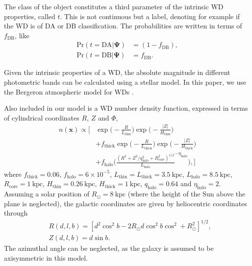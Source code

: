 \documentclass[fleqn,usenatbib]{mnras}
\newcommand{\popp}{\boldsymbol{\Psi}}
\newcommand{\pr}{\text{Pr}}
\newcommand{\kpc}{\text{kpc}}
\begin{document}
The class of the object constitutes a third parameter of the intrinsic WD properties, called $t$. This is not continuous but a label, denoting for example if the WD is of DA or DB classification. The probabilities are written in terms of $f_\text{DB}$, like
\begin{equation}\label{eq:DADB}
\begin{split}
	\pr(t=\text{DA} | \popp) & = (1-f_\text{DB}),\\
    \pr(t=\text{DB} | \popp) & = f_\text{DB}.
\end{split}
\end{equation}

Given the intrinsic properties of a WD, the absolute magnitude in different photometric bands can be calculated using a stellar model. In this paper, we use the Bergeron atmospheric model for WDs \citep{Bergeron:1995we,Finley:1997zz,Bergeron:2000ce,2001PASP..113..409F}.

Also included in our model is a WD number density function, expressed in terms of cylindrical coordinates $R$, $Z$ and $\Phi$,
\begin{equation}\label{eq:numberdensity}
\begin{split}
	n(\mathbf{x}) \propto
	\Bigg[ 
		& \exp\Bigg(-\frac{R}{L_\text{thin}}\Bigg)\exp\Bigg(-\frac{|Z|}{H_\text{thin}}\Bigg) \\
		& +f_\text{thick}\exp\Bigg(-\frac{R}{L_\text{thick}}\Bigg)\exp\Bigg(-\frac{|Z|}{H_\text{thick}}\Bigg) \\
		& +f_\text{halo}\Bigg( \frac{(R^2+Z^2/q_\text{halo}^2+R_\text{core}^2)^{1/2}}{L_\text{halo}}^{-\eta_\text{halo}} \Bigg),
	\Bigg]
\end{split}
\end{equation}
where $f_\text{thick}=0.06$, $f_\text{halo}=6\times10^{-5}$, $L_\text{thin}=L_\text{thick}=3.5~\kpc$, $L_\text{halo}=8.5~\kpc$, $R_\text{core}=1~\kpc$, $H_\text{thin}=0.26~\kpc$, $H_\text{thick}=1~\kpc$, $q_\text{halo}=0.64$ and $\eta_\text{halo} = 2$. Assuming a solar position of $R_\odot=8~\kpc$ (where the height of the Sun above the plane is neglected), the galactic coordinates are given by heliocentric coordinates through
\begin{equation}
\begin{split}
	& R(d,l,b) = [d^2\cos^2b-2 R_\odot d \cos^2b\cos^2+R_\odot^2]^{1/2}, \\
	& Z(d,l,b) = d \sin b.
\end{split}
\end{equation}
The azimuthal angle can be neglected, as the galaxy is assumed to be axisymmetric in this model.
\end{document}
